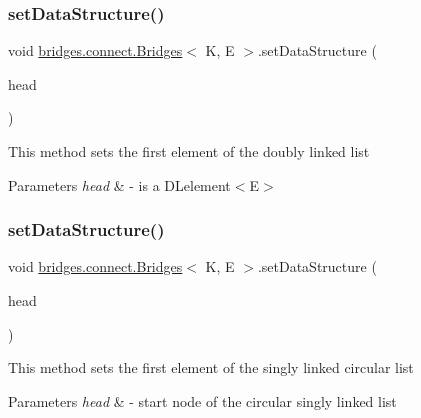 \subsubsection{\texorpdfstring{set\+Data\+Structure()}{setDataStructure()}\hspace{0.1cm}{\footnotesize\ttfamily [4/12]}}
{\footnotesize\ttfamily void \hyperlink{classbridges_1_1connect_1_1_bridges}{bridges.\+connect.\+Bridges}$<$ K, E $>$.set\+Data\+Structure (\begin{DoxyParamCaption}\item[{\hyperlink{classbridges_1_1base_1_1_d_lelement}{D\+Lelement}$<$ E $>$}]{head }\end{DoxyParamCaption})}

This method sets the first element of the doubly linked list


\begin{DoxyParams}{Parameters}
{\em head} & -\/ is a D\+Lelement$<$\+E$>$ \\
\hline
\end{DoxyParams}
\hypertarget{classbridges_1_1connect_1_1_bridges_a285a7af5ad0594d4eeca51277e627c89}{}\label{classbridges_1_1connect_1_1_bridges_a285a7af5ad0594d4eeca51277e627c89} 
\subsubsection{\texorpdfstring{set\+Data\+Structure()}{setDataStructure()}\hspace{0.1cm}{\footnotesize\ttfamily [5/12]}}
{\footnotesize\ttfamily void \hyperlink{classbridges_1_1connect_1_1_bridges}{bridges.\+connect.\+Bridges}$<$ K, E $>$.set\+Data\+Structure (\begin{DoxyParamCaption}\item[{\hyperlink{classbridges_1_1base_1_1_circ_s_lelement}{Circ\+S\+Lelement}$<$ E $>$}]{head }\end{DoxyParamCaption})}

This method sets the first element of the singly linked circular list


\begin{DoxyParams}{Parameters}
{\em head} & -\/ start node of the circular singly linked list \\
\hline
\end{DoxyParams}
\hypertarget{classbridges_1_1connect_1_1_bridges_a4e5809b18d15854b54509f9d434a4fd7}{}\label{classbridges_1_1connect_1_1_bridges_a4e5809b18d15854b54509f9d434a4fd7} 
